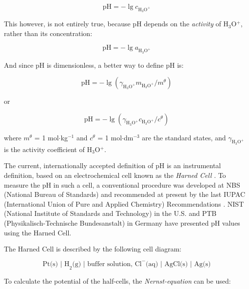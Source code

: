 \documentclass[manuscript=article, journal=jceda8]{achemso}
\begin{document}
\begin{equation}
\textrm{pH} = -\lg c_{\textrm{H}_3\textrm{O}^+}
\end{equation}

This however, is not entirely true, because pH depends on the \emph{activity} of H$_3$O$^+$, rather than its concentration:

\begin{equation}
\textrm{pH} = -\lg a_{\textrm{H}_3\textrm{O}^+}
\end{equation}

And since pH is dimensionless, a better way to define pH is:

\begin{equation}
\textrm{pH} = -\lg(\gamma_{\textrm{H}_3\textrm{O}^+} m_{\textrm{H}_3\textrm{O}^+} / m^\theta)
\end{equation}

or

\begin{equation}
\textrm{pH} = -\lg(\gamma_{\textrm{H}_3\textrm{O}^+} c_{\textrm{H}_3\textrm{O}^+} / c^\theta)
\end{equation}

where $m^\theta$ = 1 mol$\cdot$kg$^{-1}$ and $c^\theta$ = 1 mol$\cdot$dm$^{-3}$ are the standard states, and $\gamma_{\textrm{H}_3\textrm{O}^+}$ is the activity coefficient of H$_3$O$^+$. 

The current, internationally accepted definition of pH is an instrumental definition, based on an electrochemical cell known as the \emph{Harned Cell} \cite{harned1958activity}.
To measure the pH in such a cell, a conventional procedure was developed at NBS (National Bureau of Standards) \cite{durst1975standardization} and recommended at present by the last IUPAC (International Union of Pure and Applied Chemistry) Recommendations \cite{covington2002measurement}.
NIST (National Institute of Standards and Technology) in the U.S. and PTB (Physikalisch-Technische Bundesanstalt) in Germany have presented pH values using the Harned Cell. 

The Harned Cell is described by the following cell diagram: 

\begin{equation}
\textrm{Pt(s) | H}_2\textrm{(g) | buffer solution, Cl}^-\textrm{(aq) | AgCl(s) | Ag(s)}
\label{eq:harned}
\end{equation}

To calculate the potential of the half-cells, the \emph{Nernst-equation} can be used:
\end{document}
